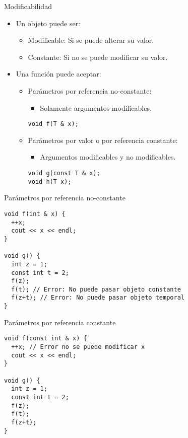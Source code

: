 \begin{frame}[fragile]{Modificabilidad}
\begin{itemize}
  \item Un objeto puede ser:
    \begin{itemize}
      \item \alert{Modificable}: Si se puede alterar su valor.
      \item \alert{Constante}: Si no se puede modificar su valor.
    \end{itemize}
  \item Una función puede aceptar:
    \begin{itemize}
      \item Parámetros por referencia no-constante:
        \begin{itemize}
          \item Solamente argumentos modificables.
        \end{itemize}
\begin{lstlisting}
void f(T & x);
\end{lstlisting}
      \item Parámetros por valor o por referencia constante:
        \begin{itemize}
          \item Argumentos modificables y no modificables.
        \end{itemize}
\begin{lstlisting}
void g(const T & x);
void h(T x);
\end{lstlisting}
    \end{itemize}
\end{itemize}
\end{frame}

\begin{frame}[fragile]{Parámetros por referencia no-constante}
\begin{lstlisting}
void f(int & x) {
  ++x;
  cout << x << endl;
}

void g() {
  int z = 1;
  const int t = 2;
  f(z);
  f(t); // Error: No puede pasar objeto constante
  f(z+t); // Error: No puede pasar objeto temporal
}
\end{lstlisting}
\end{frame}

\begin{frame}[fragile]{Parámetros por referencia constante}
\begin{lstlisting}
void f(const int & x) {
  ++x; // Error no se puede modificar x
  cout << x << endl;
}

void g() {
  int z = 1;
  const int t = 2;
  f(z);
  f(t); 
  f(z+t); 
}
\end{lstlisting}
\end{frame}

